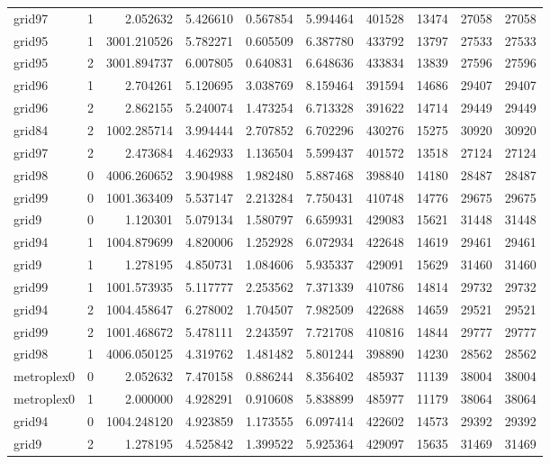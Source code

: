 \begin{longtable}{|l|r|r|r|r|r|r|r|r|r|}
grid97 & 1 & 2.052632 & 5.426610 & 0.567854 & 5.994464 & 401528 & 13474 & 27058 & 27058 \\
grid95 & 1 & 3001.210526 & 5.782271 & 0.605509 & 6.387780 & 433792 & 13797 & 27533 & 27533 \\
grid95 & 2 & 3001.894737 & 6.007805 & 0.640831 & 6.648636 & 433834 & 13839 & 27596 & 27596 \\
grid96 & 1 & 2.704261 & 5.120695 & 3.038769 & 8.159464 & 391594 & 14686 & 29407 & 29407 \\
grid96 & 2 & 2.862155 & 5.240074 & 1.473254 & 6.713328 & 391622 & 14714 & 29449 & 29449 \\
grid84 & 2 & 1002.285714 & 3.994444 & 2.707852 & 6.702296 & 430276 & 15275 & 30920 & 30920 \\
grid97 & 2 & 2.473684 & 4.462933 & 1.136504 & 5.599437 & 401572 & 13518 & 27124 & 27124 \\
grid98 & 0 & 4006.260652 & 3.904988 & 1.982480 & 5.887468 & 398840 & 14180 & 28487 & 28487 \\
grid99 & 0 & 1001.363409 & 5.537147 & 2.213284 & 7.750431 & 410748 & 14776 & 29675 & 29675 \\
grid9 & 0 & 1.120301 & 5.079134 & 1.580797 & 6.659931 & 429083 & 15621 & 31448 & 31448 \\
grid94 & 1 & 1004.879699 & 4.820006 & 1.252928 & 6.072934 & 422648 & 14619 & 29461 & 29461 \\
grid9 & 1 & 1.278195 & 4.850731 & 1.084606 & 5.935337 & 429091 & 15629 & 31460 & 31460 \\
grid99 & 1 & 1001.573935 & 5.117777 & 2.253562 & 7.371339 & 410786 & 14814 & 29732 & 29732 \\
grid94 & 2 & 1004.458647 & 6.278002 & 1.704507 & 7.982509 & 422688 & 14659 & 29521 & 29521 \\
grid99 & 2 & 1001.468672 & 5.478111 & 2.243597 & 7.721708 & 410816 & 14844 & 29777 & 29777 \\
grid98 & 1 & 4006.050125 & 4.319762 & 1.481482 & 5.801244 & 398890 & 14230 & 28562 & 28562 \\
metroplex0 & 0 & 2.052632 & 7.470158 & 0.886244 & 8.356402 & 485937 & 11139 & 38004 & 38004 \\
metroplex0 & 1 & 2.000000 & 4.928291 & 0.910608 & 5.838899 & 485977 & 11179 & 38064 & 38064 \\
grid94 & 0 & 1004.248120 & 4.923859 & 1.173555 & 6.097414 & 422602 & 14573 & 29392 & 29392 \\
grid9 & 2 & 1.278195 & 4.525842 & 1.399522 & 5.925364 & 429097 & 15635 & 31469 & 31469 \\

\end{longtable}
